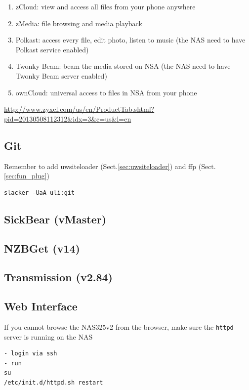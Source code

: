 \begin{enumerate}
  \item zCloud: view and access all files from your phone anywhere
  \item zMedia: file browsing and media playback 
  \item Polkast: access every file, edit photo, listen to music (the NAS need
  to have Polkast service enabled)
  \item Twonky Beam: beam the media stored on NSA (the NAS need to have Twonky
  Beam server enabled)
  \item ownCloud: universal access to files in NSA from your phone
\end{enumerate}
\url{http://www.zyxel.com/us/en/ProductTab.shtml?pid=20130508112312&idx=3&c=us&l=en}


\subsection{Git}
\label{sec:Git}

Remember to add uwsiteloader (Sect.\ref{sec:uwsiteloader}) and ffp
(Sect.\ref{sec:fun_plug})

\begin{verbatim}
slacker -UaA uli:git
\end{verbatim}

\subsection{SickBear (vMaster)}

\subsection{NZBGet (v14)}

\subsection{Transmission (v2.84)}

\subsection{Web Interface}

If you cannot browse the NAS325v2 from the browser, make sure the \verb!httpd!
server is running on the NAS
\begin{verbatim}
- login via ssh
- run
su
/etc/init.d/httpd.sh restart
\end{verbatim}

